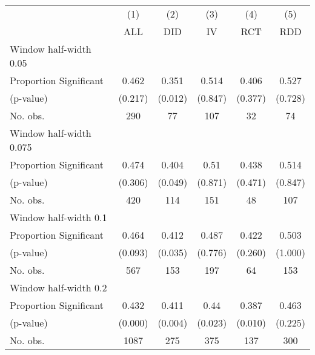 
\def\sym#1{\ifmmode^{#1}\else\(^{#1}\)\fi}
\begin{tabular}{l*{5}{c}}
\hline\hline
& \multicolumn{1}{c}{(1)} &  \multicolumn{1}{c}{(2)} &  \multicolumn{1}{c}{(3)} &  \multicolumn{1}{c}{(4)} &  \multicolumn{1}{c}{(5)}\\
& \multicolumn{1}{c}{ALL} &  \multicolumn{1}{c}{DID} &  \multicolumn{1}{c}{IV} &  \multicolumn{1}{c}{RCT} &  \multicolumn{1}{c}{RDD}\\

\hline
\hline
Window half-width 0.05\\

Proportion Significant& 0.462 &  0.351 &  0.514 &  0.406 &  0.527\\

(p-value) & (0.217) &  (0.012) &  (0.847) &  (0.377) &  (0.728)\\

No. obs.& 290 &  77 &  107 &  32 &  74\\

\hline
Window half-width 0.075\\

Proportion Significant& 0.474 &  0.404 &  0.51 &  0.438 &  0.514\\

(p-value) & (0.306) &  (0.049) &  (0.871) &  (0.471) &  (0.847)\\

No. obs.& 420 &  114 &  151 &  48 &  107\\

\hline
Window half-width 0.1\\

Proportion Significant& 0.464 &  0.412 &  0.487 &  0.422 &  0.503\\

(p-value) & (0.093) &  (0.035) &  (0.776) &  (0.260) &  (1.000)\\

No. obs.& 567 &  153 &  197 &  64 &  153\\

\hline
Window half-width 0.2\\

Proportion Significant& 0.432 &  0.411 &  0.44 &  0.387 &  0.463\\

(p-value) & (0.000) &  (0.004) &  (0.023) &  (0.010) &  (0.225)\\

No. obs.& 1087 &  275 &  375 &  137 &  300\\


\end{tabular}

